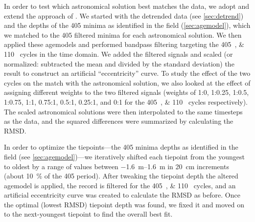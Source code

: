 \documentclass[draft]{agujournal2019}
\begin{document}
In order to test which astronomical solution best matches the data, we adopt and extend the approach of .
We started with the detrended data (see \cref{sec:detrend}) and the depths of the \qty{405}{\kiloyear} minima as identified in the field (\cref{sec:agemodel}), which we matched to the \qty{405}{\kiloyear} filtered minima for each astronomical solution.
We then applied these agemodels and performed bandpass filtering targeting the \qtylist{405;110}{\kiloyear} cycles in the time domain.
We added the filtered signals and scaled (or normalized: subtracted the mean and divided
by the standard deviation) the result to construct an artificial ``eccentricity'' curve.
To study the effect of the two cycles on the match with the astronomical solution, we also looked at the effect of assigning different weights to the two filtered signals (weights of 1:0, 1:0.25, 1:0.5, 1:0.75, 1:1, 0.75:1, 0.5:1, 0.25:1, and 0:1 for the \qtylist{405;110}{\kiloyear} cycles respectively).
The scaled astronomical solutions were then interpolated to the same timesteps as the data, and the squared differences were summarized by calculating the \gls{RMSD}.

In order to optimize the tiepoints---the \qty{405}{\kiloyear} minima depths as identified in the field (see \cref{sec:agemodel})---we iteratively shifted each tiepoint from the youngest to oldest by a range of values between \qtyrange[range-phrase=~to~]{-1.6}{1.6}{\metre} in \qty{20}{\centi\metre} increments (about \qty{10}{\percent} of the \qty{405}{\kiloyear} period).
After tweaking the tiepoint depth the altered agemodel is applied, the record is filtered for the \qtylist{405;110}{\kiloyear} cycles, and an artificial eccentricity curve was created to calculate the \gls{RMSD} as before.
Once the optimal (lowest \gls{RMSD}) tiepoint depth was found, we fixed it and moved on to the next-youngest tiepoint to find the overall best fit.
\end{document}
